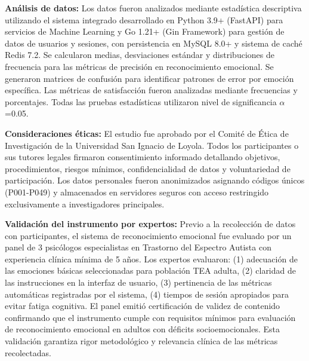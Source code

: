 \documentclass[journal,article,submit,pdftex,moreauthors]{Definitions/mdpi}
\begin{document}
	\textbf{Análisis de datos:} Los datos fueron analizados mediante estadística descriptiva utilizando el sistema integrado desarrollado en Python 3.9+ (FastAPI) para servicios de Machine Learning y Go 1.21+ (Gin Framework) para gestión de datos de usuarios y sesiones, con persistencia en MySQL 8.0+ y sistema de caché Redis 7.2. Se calcularon medias, desviaciones estándar y distribuciones de frecuencia para las métricas de precisión en reconocimiento emocional. Se generaron matrices de confusión para identificar patrones de error por emoción específica. Las métricas de satisfacción fueron analizadas mediante frecuencias y porcentajes. Todas las pruebas estadísticas utilizaron nivel de significancia $\alpha$=0.05.
	
	\textbf{Consideraciones éticas:} El estudio fue aprobado por el Comité de Ética de Investigación de la Universidad San Ignacio de Loyola. Todos los participantes o sus tutores legales firmaron consentimiento informado detallando objetivos, procedimientos, riesgos mínimos, confidencialidad de datos y voluntariedad de participación. Los datos personales fueron anonimizados asignando códigos únicos (P001-P049) y almacenados en servidores seguros con acceso restringido exclusivamente a investigadores principales.
	
	\textbf{Validación del instrumento por expertos:} Previo a la recolección de datos con participantes, el sistema de reconocimiento emocional fue evaluado por un panel de 3 psicólogos especialistas en Trastorno del Espectro Autista con experiencia clínica mínima de 5 años. Los expertos evaluaron: (1) adecuación de las emociones básicas seleccionadas para población TEA adulta, (2) claridad de las instrucciones en la interfaz de usuario, (3) pertinencia de las métricas automáticas registradas por el sistema, (4) tiempos de sesión apropiados para evitar fatiga cognitiva. El panel emitió certificación de validez de contenido confirmando que el instrumento cumple con requisitos mínimos para evaluación de reconocimiento emocional en adultos con déficits socioemocionales. Esta validación garantiza rigor metodológico y relevancia clínica de las métricas recolectadas.
	
\end{document}

